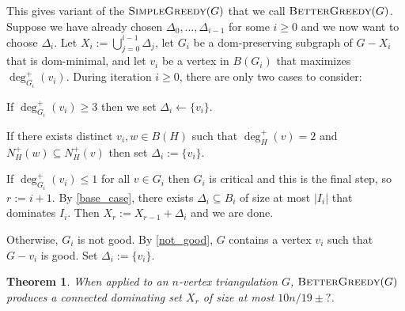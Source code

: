 \documentclass[12pt]{article}
\newtheorem{thm}{Theorem}
\begin{document}
This gives variant of the $\textsc{SimpleGreedy}(G)$ that we call $\textsc{BetterGreedy}(G)$.  Suppose we have already chosen $\Delta_0,\ldots,\Delta_{i-1}$ for some $i\ge 0$ and we now want to choose $\Delta_i$.  Let $X_i:=\bigcup_{j=0}^{i-1}\Delta_j$, let $G_i$ be a dom-preserving subgraph of $G-X_i$ that is dom-minimal, and let $v_i$ be a vertex in $B(G_i)$ that maximizes $\deg^+_{G_i}(v_i)$.  During iteration $i\ge 0$, there are only two cases to consider:
\begin{compactenum}
    \item If $\deg^+_{G_i}(v_i)\ge 3$ then we set $\Delta_i\gets\{v_i\}$.
    \item If there exists distinct $v_i,w\in B(H)$ such that $\deg^+_H(v)=2$ and $N^+_H(w)\subseteq N^+_H(v)$ then set $\Delta_i:=\{v_i\}$.
    \item If $\deg^+_{G_i}(v_i)\le 1$ for all $v\in G_i$ then $G_i$ is critical and this is the final step, so $r:=i+1$.  By \cref{base_case}, there exists $\Delta_i\subseteq B_i$ of size at most $|I_i|$ that dominates $I_i$. Then $X_r:=X_{r-1}+\Delta_{i}$ and we are done.
    \item Otherwise, $G_i$ is not good.  By \cref{not_good}, $G$ contains a vertex $v_i$ such that $G-v_i$ is good.  Set $\Delta_i:=\{v_i\}$.
\end{compactenum}

\begin{thm}\label{better_greedy}
  When applied to an $n$-vertex triangulation $G$,  $\textsc{BetterGreedy}(G)$ produces a connected dominating set $X_r$ of size at most $10n/19\pm{?}$.
\end{thm}
\end{document}
